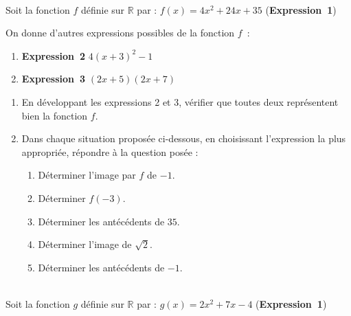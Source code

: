 \exercice~\\
Soit la fonction $f$ définie sur $\mathbb{R}$ par : $f(x) = 4x^2 + 24x + 35$ (\textbf{Expression~1})

On donne d’autres expressions possibles de la fonction $f$~:

\begin{enumerate}[~~~~]
	
	\item \textbf{Expression~2} $4(x + 3)^2 - 1$
	
	
	\item \textbf{Expression~3} $(2x + 5)(2x + 7)$
	
\end{enumerate}

\begin{enumerate}
	\item En développant les expressions 2 et 3, vérifier que toutes deux représentent bien la fonction $f$.
	\item Dans chaque situation proposée ci-dessous, en choisissant l’expression la plus appropriée, répondre à la question posée :
	\begin{enumerate}
		\item Déterminer l’image par $f$ de $-1$.
		\item Déterminer $f(-3)$.
		\item Déterminer les antécédents de $35$.
		\item Déterminer l’image de $\sqrt{2}$.
		\item Déterminer les antécédents de $-1$.
	\end{enumerate}
\end{enumerate}	 


\exerciceprime~\\
Soit la fonction $g$ définie sur $\mathbb{R}$ par : $g(x) = 2x^2 + 7x - 4$ (\textbf{Expression~1})

